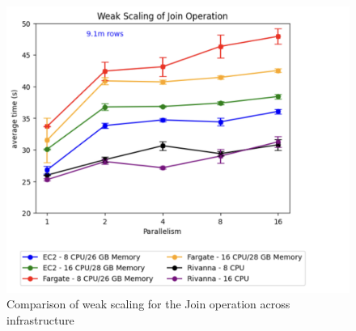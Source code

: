 \begin{figure}[ht]
    \begin{center}
    \includegraphics[width=\linewidth]{source/Figure/weakscaling1.png}
    \end{center}
    \caption{Comparison of weak scaling for the Join operation across infrastructure}
    \label{fig:weakscaling1}
\end{figure}

